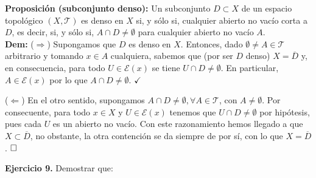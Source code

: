 \documentclass{article}
\begin{document}
\vspace{1cm}

\noindent\textbf{Proposición (subconjunto denso):} Un subconjunto $D \subset X$ de un espacio topológico $(X, \mathcal{T})$ es denso en $X$ si, y sólo si, cualquier abierto no vacío corta a $D$, es decir, si, y sólo si, $A \cap D \neq \emptyset$ para cualquier abierto no vacío $A$. \\

\noindent\textbf{Dem:} ($\Longrightarrow$) Supongamos que $D$ es denso en $X$. Entonces, dado $\emptyset \neq A \in \mathcal{T}$ arbitrario y tomando $x \in A$ cualquiera, sabemos que (por ser $D$ denso) $X = \overline{D}$ y, en consecuencia, para todo $U \in \mathcal{E}(x)$ se tiene $U \cap D \neq \emptyset$. En particular, $A \in \mathcal{E}(x)$ por lo que $A \cap D \neq \emptyset$. $\checkmark$ 

\vspace{0.15cm}

\noindent ($\Longleftarrow$) En el otro sentido, supongamos $A \cap D \neq \emptyset, \forall A \in \mathcal{T}$, con $A \neq \emptyset$. Por consecuente, para todo $x \in X$ y $U \in \mathcal{E}(x)$ tenemos que $U \cap D \neq \emptyset$ por hipótesis, pues cada $U$ es un abierto no vacío. Con este razonamiento hemos llegado a que $X \subset \overline{D}$, no obstante, la otra contención se da siempre de por sí, con lo que $X = \overline{D}$. $\hfill\square$

\newpage

\noindent\textbf{Ejercicio 9.} Demostrar que:
\end{document}
